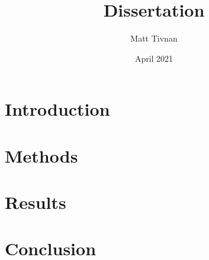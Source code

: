 \documentclass{article}
\title{Dissertation}
\author{Matt Tivnan }
\date{April 2021}
\begin{document}
\maketitle

\section{Introduction}
\section{Methods}
\section{Results}
\section{Conclusion}
\end{document}
